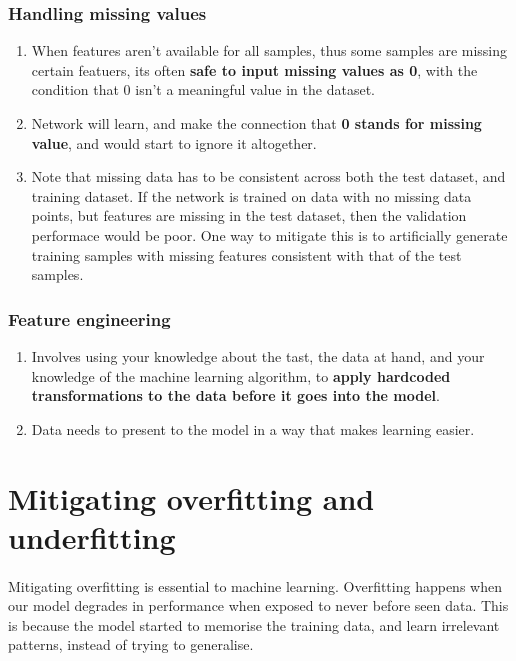 \documentclass[12pt, a4paper]{article}
\begin{document}
\subsubsection{Handling missing values}
\begin{enumerate}
   \item When features aren't available for all samples, thus some samples are missing certain featuers,
   its often \textbf{safe to input missing values as 0}, with the condition that
   0 isn't a meaningful value in the dataset.
   \item Network will learn, and make the connection that \textbf{0 stands for missing value},
   and would start to ignore it altogether.
   \item Note that missing data has to be consistent across both the test dataset,
   and training dataset. If the network is trained on data with no missing data points,
   but features are missing in the test dataset, then the validation performace would be poor.
   One way to mitigate this is to artificially generate training samples with missing features consistent with that of 
   the test samples.
\end{enumerate}

\subsubsection{Feature engineering}
\begin{enumerate}
   \item Involves using your knowledge about the tast, the data at hand, and your knowledge of the machine learning algorithm,
   to \textbf{apply hardcoded transformations to the data before it goes into the model}.
   \item Data needs to present to the model in a way that makes learning easier.
\end{enumerate}

\section{Mitigating overfitting and  underfitting}
\paragraph*{}
Mitigating overfitting is essential to machine learning. Overfitting happens when 
our model degrades in performance when exposed to never before seen data. This is because 
the model started to memorise the training data, and learn irrelevant patterns, instead of 
trying to generalise.
\end{document}
